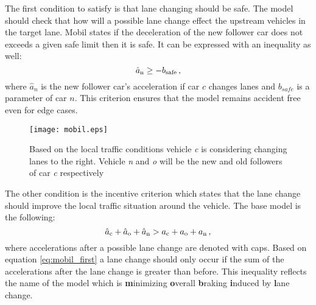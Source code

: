 		The first condition to satisfy is that lane changing should be safe. The model should check that how will a possible lane change effect the upstream vehicles in the target lane. Mobil states if the deceleration of the new follower car does not exceeds a given safe limit then it is safe. It can be expressed with an inequality as well:
		\begin{equation}
			\hat{a}_{\rm n}\geq -b_{\rm safe}\,,
		\end{equation}
		where $\hat{a}_n$ is the new follower car's acceleration if car $c$ changes lanes and $b_{safe}$ is a parameter of car $n$. This criterion ensures that the model remains accident free even for edge cases.
			\begin{figure}[ht]
				\centering
				\texttt{[image: mobil.eps]}
				\caption{Based on the local traffic conditions vehicle \textit{c} is considering changing lanes  to the right. Vehicle \textit{n} and \textit{o} will be the new and old followers of car \textit{c} respectively}
				\label{fig:mobil}
			\end{figure}
			The other condition is the incentive criterion which states that the lane change should improve the local traffic situation around the vehicle.  The base model is the following:
			\begin{equation}
				\hat{a}_{\rm c} + \hat{a}_{\rm o} + \hat{a}_{\rm n} > a_{\rm c} + a_{\rm o} + a_{\rm n}\,,
				\label{eq:mobil_first}
			\end{equation}
			where accelerations after a possible lane change are denoted with caps.
			Based on equation \ref{eq:mobil_first} a lane change should only occur if the sum of the accelerations after the lane change is greater than before. This inequality reflects the name of the model which is \textbf{m}inimizing \textbf{o}verall \textbf{b}raking \textbf{i}nduced by \textbf{l}ane change.

